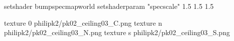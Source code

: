 setshader bumpspecmapworld
setshaderparam "specscale" 1.5 1.5 1.5

texture 0 philipk2/pk02_ceiling03_C.png
texture n philipk2/pk02_ceiling03_N.png
texture s philipk2/pk02_ceiling03_S.png

